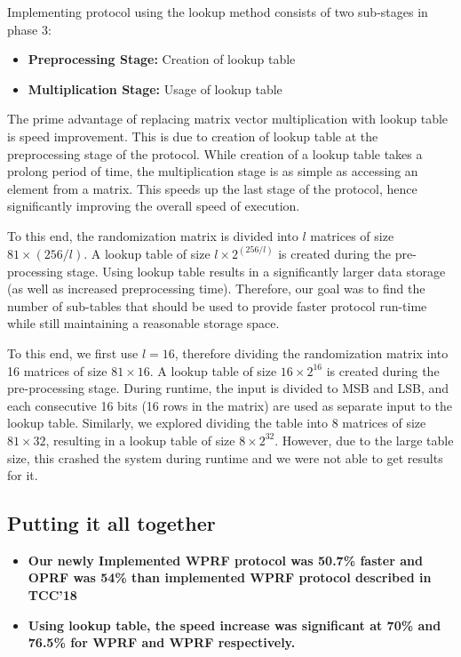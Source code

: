 Implementing protocol using the lookup method consists of two sub-stages in phase 3:\\
\begin{itemize}
	\item{\textbf{Preprocessing Stage: } Creation of lookup table}
	\item{\textbf{Multiplication Stage: } Usage of lookup table}
\end{itemize}


The prime advantage of replacing matrix vector multiplication with lookup table is speed improvement. This is due to creation of lookup table at the preprocessing stage of the protocol. While creation of a lookup table takes a prolong period of time, the multiplication stage is as simple as accessing an element from a matrix. This speeds up the last stage of the protocol, hence significantly improving the overall speed of execution.

To this end, the randomization matrix is divided into $l$ matrices of size $81 \times (256/l)$. A lookup table of size $l \times 2^{ (256/l)  }$ is created during the pre-processing stage.
Using lookup table results in a significantly larger data storage (as well as increased preprocessing time). Therefore, our goal was to find the number of sub-tables that should be used to provide faster protocol run-time while still maintaining a reasonable storage space.

To this end, we first use $l=16$, therefore dividing the randomization matrix into 16 matrices of size $81 \times 16$. A lookup table of size $16 \times 2^{16}$ is created during the pre-processing stage. During runtime, the input is divided to MSB and LSB, and each consecutive 16 bits (16 rows in the matrix) are used as separate input to the lookup table.  Similarly, we explored dividing the table into 8 matrices of size $81 \times 32$, resulting in a lookup table of size $8  \times 2^{32} $. However, due to the large table size, this crashed the system during runtime and we were not able to get results for it.	

\subsection{Putting it all together}

\begin{itemize}
	\item{\textbf{Our newly Implemented WPRF protocol was 50.7\% faster and OPRF was 54\% than implemented WPRF protocol described in TCC'18 \cite{darkmatter}}}
	\item{\textbf{Using lookup table, the speed increase was significant at 70\% and 76.5\% for WPRF and WPRF respectively.}}
\end{itemize}

